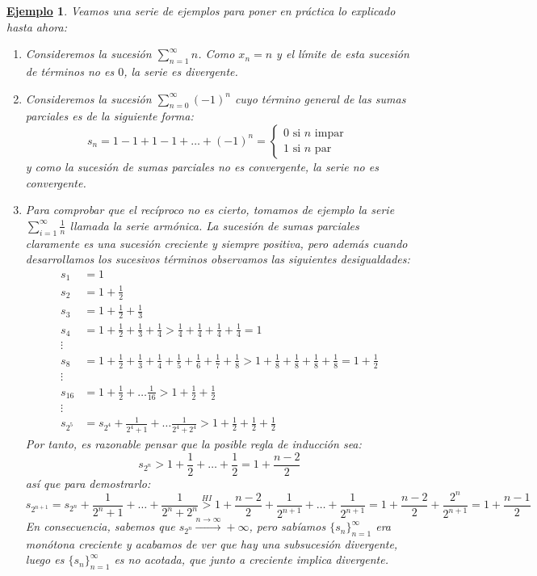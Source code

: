 \documentclass[10pt,a4paper,openright]{book}
\theoremstyle{break}
\newtheorem{ej}{\underline{Ejemplo}}[chapter]
\begin{document}
\begin{ej}
Veamos una serie de ejemplos para poner en práctica lo explicado hasta ahora:
\begin{enumerate}
\item Consideremos la sucesión $\sum_{n=1}^\infty n$. Como $x_n = n$ y el límite de esta sucesión de términos no es $0$, la serie es divergente.

\item Consideremos la sucesión $\sum_{n=0}^{\infty} (-1)^n$ cuyo término general de las sumas parciales es de la siguiente forma:
\[
s_n = 1 - 1 + 1 - 1 + \ldots + (-1)^n =
\begin{cases}
0 \mbox { si $n$ impar } \\
1 \mbox { si $n$ par }
\end{cases}
\]
y como la sucesión de sumas parciales no es convergente, la serie no es convergente.

\item Para comprobar que el recíproco no es cierto, tomamos de ejemplo la serie $\sum_{i = 1 }^{\infty} \frac{1}{n}$ llamada la serie armónica. La sucesión de sumas parciales claramente es una sucesión creciente y siempre positiva, pero además cuando desarrollamos los sucesivos términos observamos las siguientes desigualdades:
\begin{align*}
s_1 &= 1 \\
s_2 &= 1 + \frac{1}{2} \\
s_3 &=  1 + \frac{1}{2} + \frac{1}{3} \\
s_4 &= 1 + \frac{1}{2} + \frac{1}{3} + \frac{1}{4} > \frac{1}{4} + \frac{1}{4} + \frac{1}{4} + \frac{1}{4} = 1 \\
\vdots \\
s_8 &= 1 + \frac{1}{2} + \frac{1}{3} + \frac{1}{4} + \frac{1}{5} + \frac{1}{6} + \frac{1}{7} + \frac{1}{8} > 1 + \frac{1}{8} + \frac{1}{8} + \frac{1}{8} + \frac{1}{8} = 1 + \frac{1}{2} \\
\vdots \\
s_{16} &= 1 + \frac{1}{2} + \ldots \frac{1}{16} >1 + \frac{1}{2} + \frac{1}{2} \\
\vdots \\
s_{2^5} &= s_{2^4} + \frac{1}{2^4 + 1} + \ldots \frac{1}{2^4 + 2^4} > 1 + \frac{1}{2} + \frac{1}{2} + \frac{1}{2}
\end{align*}
Por tanto, es razonable pensar que la posible regla de inducción sea:
$$s_{2^n} > 1 + \frac{1}{2} + \ldots + \frac{1}{2} = 1 + \frac{n-2}{2}$$
así que para demostrarlo:
$$s_{2^{n+1}} = s_{2^n} + \frac{1}{2^n + 1} + \ldots + \frac{1}{2^n + 2^n} \overset{HI}{>} 1 +  \frac{n-2}{2} + \frac{1}{2^{n + 1}} + \ldots  + \frac{1}{2^{n + 1}} = 1+\frac{n-2}{2}+\frac{2^n}{2^{n+1}}= 1 + \frac{n-1}{2}$$
En consecuencia, sabemos que $s_{2^n} \xrightarrow{n\rightarrow\infty} + \infty$, pero sabíamos $\{s_n\}_{n=1}^\infty$ era monótona creciente y acabamos de ver que hay una subsucesión divergente, luego es $\{s_n\}_{n=1}^\infty$ es no acotada, que junto a creciente implica divergente.
\end{enumerate}
\end{ej}
\end{document}

